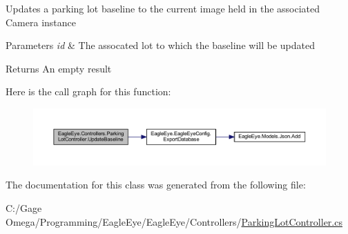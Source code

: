 Updates a parking lot baseline to the current image held in the associated Camera instance 


\begin{DoxyParams}{Parameters}
{\em id} & The assocated lot to which the baseline will be updated\\
\hline
\end{DoxyParams}
\begin{DoxyReturn}{Returns}
An empty result
\end{DoxyReturn}
Here is the call graph for this function\+:
\nopagebreak
\begin{figure}[H]
\begin{center}
\leavevmode
\includegraphics[width=350pt]{class_eagle_eye_1_1_controllers_1_1_parking_lot_controller_a073d77794ca654b813b37deae908501a_cgraph}
\end{center}
\end{figure}


The documentation for this class was generated from the following file\+:\begin{DoxyCompactItemize}
\item 
C\+:/\+Gage Omega/\+Programming/\+Eagle\+Eye/\+Eagle\+Eye/\+Controllers/\mbox{\hyperlink{_parking_lot_controller_8cs}{Parking\+Lot\+Controller.\+cs}}\end{DoxyCompactItemize}
